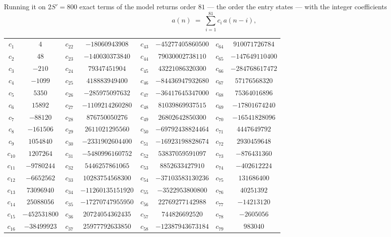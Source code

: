 \documentclass[11pt,a4paper]{article}
\theoremstyle{plain}
\theoremstyle{definition}
\begin{document}
Running it on $2S'=800$ exact terms of the model returns order $81$ --- the order the
entry states --- with the integer coefficients
\[
a(n)\;=\;\sum_{i=1}^{81}c_i\,a(n-i),
\]
\begin{center}\small
\begin{tabular}{cccccccc}
$c_{1}$ & $4$ & $c_{22}$ & $-18060943908$ & $c_{43}$ & $-45277405860500$ & $c_{64}$ & $910071726784$ \\
$c_{2}$ & $48$ & $c_{23}$ & $-140030373840$ & $c_{44}$ & $79030002738110$ & $c_{65}$ & $-147649110400$ \\
$c_{3}$ & $-210$ & $c_{24}$ & $79347451904$ & $c_{45}$ & $43221086320300$ & $c_{66}$ & $-284768617472$ \\
$c_{4}$ & $-1099$ & $c_{25}$ & $418883949400$ & $c_{46}$ & $-84436947932680$ & $c_{67}$ & $57176568320$ \\
$c_{5}$ & $5350$ & $c_{26}$ & $-285975097632$ & $c_{47}$ & $-36417645347000$ & $c_{68}$ & $75364016896$ \\
$c_{6}$ & $15892$ & $c_{27}$ & $-1109214260280$ & $c_{48}$ & $81039869937515$ & $c_{69}$ & $-17801674240$ \\
$c_{7}$ & $-88120$ & $c_{28}$ & $876750050276$ & $c_{49}$ & $26802642850300$ & $c_{70}$ & $-16541828096$ \\
$c_{8}$ & $-161506$ & $c_{29}$ & $2611021295560$ & $c_{50}$ & $-69792438824464$ & $c_{71}$ & $4447649792$ \\
$c_{9}$ & $1054840$ & $c_{30}$ & $-2331902604400$ & $c_{51}$ & $-16923198828674$ & $c_{72}$ & $2930459648$ \\
$c_{10}$ & $1207264$ & $c_{31}$ & $-5480996160752$ & $c_{52}$ & $53837059591097$ & $c_{73}$ & $-876431360$ \\
$c_{11}$ & $-9780244$ & $c_{32}$ & $5446257861065$ & $c_{53}$ & $8852633427910$ & $c_{74}$ & $-402612224$ \\
$c_{12}$ & $-6652562$ & $c_{33}$ & $10283754568300$ & $c_{54}$ & $-37103583130236$ & $c_{75}$ & $131686400$ \\
$c_{13}$ & $73096940$ & $c_{34}$ & $-11260135151920$ & $c_{55}$ & $-3522953800800$ & $c_{76}$ & $40251392$ \\
$c_{14}$ & $25088056$ & $c_{35}$ & $-17270747955950$ & $c_{56}$ & $22769277142988$ & $c_{77}$ & $-14213120$ \\
$c_{15}$ & $-452531800$ & $c_{36}$ & $20724054362435$ & $c_{57}$ & $744826692520$ & $c_{78}$ & $-2605056$ \\
$c_{16}$ & $-38499923$ & $c_{37}$ & $25977792633850$ & $c_{58}$ & $-12387943673184$ & $c_{79}$ & $983040$ \\

\end{tabular}
\end{center}
\end{document}
